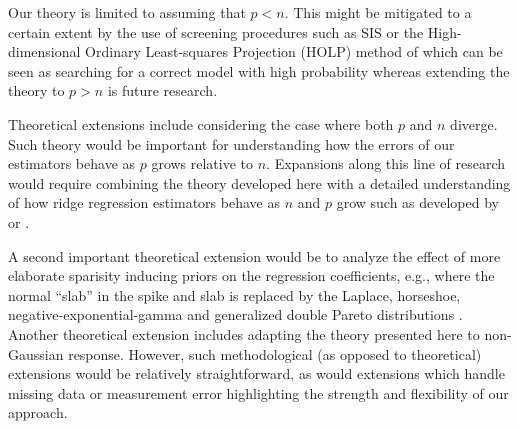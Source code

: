 \documentclass[11pt]{article}
\newtheorem{Main Result}{Main Result}
\newcommand{\joc}[1]{{\color{black}#1}}
\begin{document}
Our theory is limited to assuming that $p<n$. This 
might be mitigated to a certain extent by the use of screening procedures such 
as SIS \citep{FanLv2008} or the High-dimensional Ordinary Least-squares Projection
(HOLP) method of \cite{WangChen2015} 
which can be seen as searching for a correct model with high probability
whereas extending the theory to $p>n$ is future research.


Theoretical extensions include considering the case where both $p$ and
$n$ diverge. Such theory would be important for understanding how the errors
of our estimators behave as $p$ grows relative to $n$. Expansions along this
line of research would require combining the theory developed here with
a detailed understanding of how ridge regression estimators behave as $n$ and
$p$ grow such as developed by \cite{HsuEtal2014} or \cite{WangChen2015}.


A second important theoretical
extension would be to analyze the effect of more elaborate \joc{sparisity inducing}
priors on
the regression coefficients, e.g., where the normal ``slab'' in the spike and
slab is replaced by the Laplace, horseshoe, negative-exponential-gamma and 
generalized double Pareto distributions \citep[see ][]{wandormerod2011}.
Another theoretical extension includes adapting the theory presented here to
non-Gaussian response.
However, such methodological (as opposed to theoretical) extensions would
be relatively straightforward, as would extensions which handle missing data
or measurement error highlighting the strength and flexibility of our approach.




 










\end{document}
